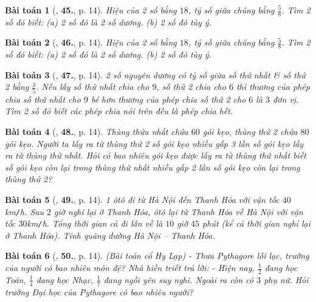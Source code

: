 \documentclass{article}
\numberwithin{equation}{section}
\newtheorem{baitoan}{Bài toán}
\begin{document}
\begin{baitoan}[\cite{SBT_Toan_8_tap_2}, \textbf{45.}, p. 14]
	Hiệu của 2 số bằng $18$, tỷ số giữa chúng bằng $\frac{5}{8}$. Tìm 2 số đó biết: (a) 2 số đó là 2 số dương. (b) 2 số đó tùy ý.
\end{baitoan}

\begin{baitoan}[\cite{SBT_Toan_8_tap_2}, \textbf{46.}, p. 14]
	Hiệu của 2 số bằng $18$, tỷ số giữa chúng bằng $\frac{5}{8}$. Tìm 2 số đó biết: (a) 2 số đó là 2 số dương. (b) 2 số đó tùy ý.
\end{baitoan}

\begin{baitoan}[\cite{SBT_Toan_8_tap_2}, \textbf{47.}, p. 14]
	2 số nguyên dương có tỷ số giữa số thứ nhất \& số thứ 2 bằng $\frac{3}{5}$. Nếu lấy số thứ nhất chia cho $9$, số thứ 2 chia cho $6$ thì thương của phép chia số thứ nhất cho $9$ bé hơn thương của phép chia số thứ 2 cho $6$ là $3$ đơn vị. Tìm 2 số đó biết các phép chia nói trên đều là phép chia hết.
\end{baitoan}

\begin{baitoan}[\cite{SBT_Toan_8_tap_2}, \textbf{48.}, p. 14]
	Thùng thứu nhất chứa $60$ gói kẹo, thùng thứ 2 chứa $80$ gói kẹo. Người ta lấy ra từ thùng thứ 2 số gói kẹo nhiều gấp 3 lần số gói kẹo lấy ra từ thùng thứ nhất. Hỏi có bao nhiêu gói kẹo được lấy ra từ thùng thứ nhất biết số gói kẹo còn lại trong thùng thứ nhất nhiều gấp 2 lần số gói kẹo còn lại trong thùng thứ 2?
\end{baitoan}

\begin{baitoan}[\cite{SBT_Toan_8_tap_2}, \textbf{49.}, p. 14]
	1 ôtô đi từ Hà Nội đến Thanh Hóa với vận tốc $40$\emph{km\texttt{/}h}. Sau $2$ giờ nghỉ lại ở Thanh Hóa, ôtô lại từ Thanh Hóa về Hà Nội với vận tốc $30$\emph{km\texttt{/}h}. Tổng thời gian cả đi lẫn về là $10$ giờ $45$ phút (kể cả thời gian nghỉ lại ở Thanh Hóa). Tính quãng đường Hà Nội -- Thanh Hóa.
\end{baitoan}

\begin{baitoan}[\cite{SBT_Toan_8_tap_2}, \textbf{50.}, p. 14]
	\emph{(Bài toán cổ Hy Lạp)} - Thưa Pythagore lỗi lạc, trường của người có bao nhiêu môn đệ? Nhà hiền triết trả lời: - Hiện nay, $\frac{1}{2}$ đang học Toán, $\frac{1}{4}$ đang học Nhạc, $\frac{1}{7}$ đang ngồi yên suy nghĩ. Ngoài ra còn có $3$ phụ nữ. Hỏi trường Đại học của Pythagore có bao nhiêu người?
\end{baitoan}
\end{document}
